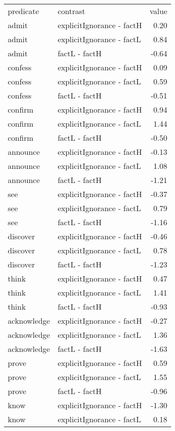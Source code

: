 \begin{longtable}{llr}
 predicate & contrast & value \\ 
 admit & explicitIgnorance - factH & 0.20 \\ 
  admit & explicitIgnorance - factL & 0.84 \\ 
  admit & factL - factH & -0.64 \\ 
  confess & explicitIgnorance - factH & 0.09 \\ 
  confess & explicitIgnorance - factL & 0.59 \\ 
  confess & factL - factH & -0.51 \\ 
  confirm & explicitIgnorance - factH & 0.94 \\ 
  confirm & explicitIgnorance - factL & 1.44 \\ 
  confirm & factL - factH & -0.50 \\ 
  announce & explicitIgnorance - factH & -0.13 \\ 
  announce & explicitIgnorance - factL & 1.08 \\ 
  announce & factL - factH & -1.21 \\ 
  see & explicitIgnorance - factH & -0.37 \\ 
  see & explicitIgnorance - factL & 0.79 \\ 
  see & factL - factH & -1.16 \\ 
  discover & explicitIgnorance - factH & -0.46 \\ 
  discover & explicitIgnorance - factL & 0.78 \\ 
  discover & factL - factH & -1.23 \\ 
  think & explicitIgnorance - factH & 0.47 \\ 
  think & explicitIgnorance - factL & 1.41 \\ 
  think & factL - factH & -0.93 \\ 
  acknowledge & explicitIgnorance - factH & -0.27 \\ 
  acknowledge & explicitIgnorance - factL & 1.36 \\ 
  acknowledge & factL - factH & -1.63 \\ 
  prove & explicitIgnorance - factH & 0.59 \\ 
  prove & explicitIgnorance - factL & 1.55 \\ 
  prove & factL - factH & -0.96 \\ 
  know & explicitIgnorance - factH & -1.30 \\ 
  know & explicitIgnorance - factL & 0.18 \\ 

\end{longtable}
